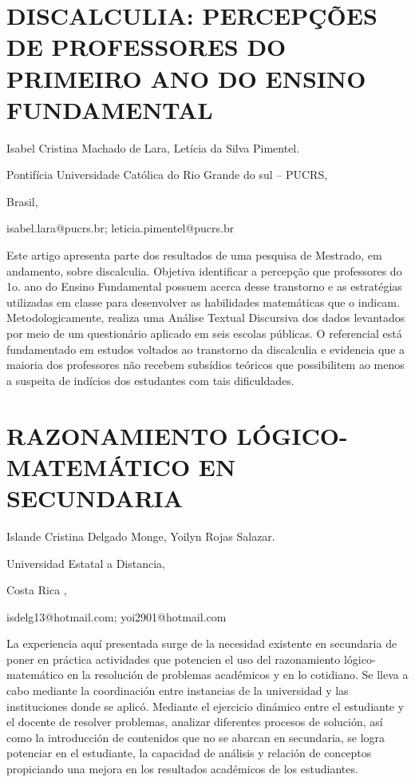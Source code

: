 \section{DISCALCULIA: PERCEPÇÕES DE PROFESSORES DO PRIMEIRO ANO DO ENSINO
FUNDAMENTAL}

\begin{datos}

Isabel Cristina Machado de Lara, Letícia da Silva Pimentel.

Pontifícia Universidade Católica do Rio Grande do sul – PUCRS,

Brasil,

isabel.lara@pucrs.br; leticia.pimentel@pucrs.br

\end{datos}

Este artigo apresenta parte dos resultados de uma pesquisa de Mestrado,
em andamento, sobre discalculia. Objetiva identificar a percepção
que professores do 1o. ano do Ensino Fundamental possuem acerca desse
transtorno e as estratégias utilizadas em classe para desenvolver
as habilidades matemáticas que o indicam. Metodologicamente, realiza
uma Análise Textual Discursiva dos dados levantados por meio de um
questionário aplicado em seis escolas públicas. O referencial está
fundamentado em estudos voltados ao transtorno da discalculia e evidencia
que a maioria dos professores não recebem subsídios teóricos que possibilitem
ao menos a suspeita de indícios dos estudantes com tais dificuldades.


\section{RAZONAMIENTO LÓGICO-MATEMÁTICO EN SECUNDARIA }

\begin{datos}

Islande Cristina Delgado Monge, Yoilyn Rojas Salazar.

Universidad Estatal a Distancia,

Costa Rica ,

isdelg13@hotmail.com; yoi2901@hotmail.com

\end{datos}

La experiencia aquí presentada surge de la necesidad existente en
secundaria de poner en práctica actividades que potencien el uso del
razonamiento lógico-matemático en la resolución de problemas académicos
y en lo cotidiano. Se lleva a cabo mediante la coordinación entre
instancias de la universidad y las instituciones donde se aplicó.
Mediante el ejercicio dinámico entre el estudiante y el docente de
resolver problemas, analizar diferentes procesos de solución, así
como la introducción de contenidos que no se abarcan en secundaria,
se logra potenciar en el estudiante, la capacidad de análisis y relación
de conceptos propiciando una mejora en los resultados académicos de
los estudiantes.

